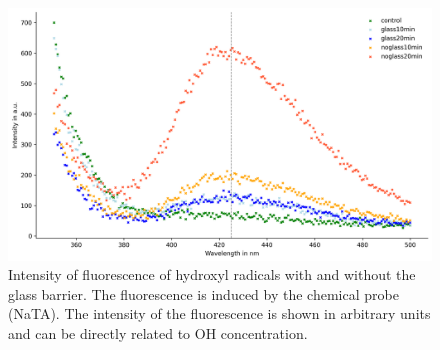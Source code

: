 \begin{figure}
    \centering
    \includegraphics[width=.8\textwidth]{images/OH_concentration.png}
    \caption[Intensity of Fluorescence of Hydroxyl Radicals via Chemical Probe Method]{Intensity of fluorescence of hydroxyl radicals with and without the glass barrier. The fluorescence is induced by the chemical probe (NaTA). The intensity of the fluorescence is shown in arbitrary units and can be directly related to OH concentration.}
    \label{fig:oh}
\end{figure}